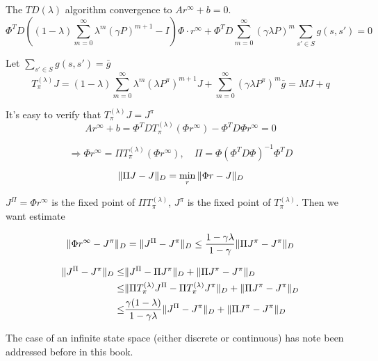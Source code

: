 The $ TD(\lambda) $ algorithm convergence to $ Ar^{\infty} + b = 0 $.
\[
    \Phi^T D \left( (1 - \lambda) \sum^{\infty}_{m = 0} \lambda^m{(\gamma P)}^{m+1} - I \right) \Phi \cdot r^{\infty}
    + \Phi^{T} D \sum^{\infty}_{m = 0} {(\gamma \lambda P)}^{m} \sum^{}_{s' \in S} g(s, s') = 0
\]
\begin{definition} Let $ \sum^{}_{s' \in S} g(s, s') = \bar g $
    \[
        T_{\pi}^{(\lambda)} J = (1 - \lambda) \sum^{\infty}_{m = 0} \lambda^m {(\lambda P^{\pi})}^{m+1} J + \sum^{\infty}_{m=0} {(\gamma\lambda P^{\pi})}^{m} \bar g = MJ + q
    \]
\end{definition}
It's easy to verify that $ T^{(\lambda)}_{\pi} J = J^{\pi} $
\[
    A r^{\infty} + b = \Phi^T D T^{(\lambda)}_{\pi} (\Phi r^{\infty}) - \Phi^T D \Phi r^{\infty} = 0
\]

\[
    \Rightarrow \Phi r^{\infty} = \Pi  T^{(\lambda)}_{\pi}(\Phi r^{\infty}), \quad
    \Pi = \Phi {(\Phi^T D \Phi)}^{-1} \Phi^T D
\]

\begin{lemma}
    \[
        \Arrowvert \Pi J - J \Arrowvert_{D} = \min_{r} \Arrowvert \Phi r - J \Arrowvert_{D}
    \]
\end{lemma}

$ J^{\Pi} = \Phi r^{\infty} $ is the fixed point of $ \Pi T^{(\lambda)}_{\pi} $, $ J^{\pi} $ is the fixed point of $ T^{(\lambda)}_{\pi} $. Then we want estimate

\begin{lemma}
    \[
        \Arrowvert \Phi r^{\infty} - J^{\pi} \Arrowvert_{D} = \Arrowvert J^{\Pi} - J^{\pi} \Arrowvert_D \le \frac{1 - \gamma\lambda}{1 - \gamma} \Arrowvert \Pi J^{\pi} - J^{\pi} \Arrowvert_D 
    \]
\end{lemma}
\begin{align*}
    \Arrowvert J^{\Pi} - J^{\pi} \Arrowvert_D \le& \Arrowvert J^{\Pi} - \Pi J^{\pi} \Arrowvert_D + \Arrowvert \Pi J^{\pi} - J^{\pi} \Arrowvert_D\\
    \le& \Arrowvert \Pi T^{(\lambda)}_{\pi} J^{\Pi} - \Pi T^{(\lambda)}_{\pi} J^{\pi} \Arrowvert_{D} +\Arrowvert \Pi J^{\pi} - J^{\pi} \Arrowvert_D\\
    \le& \frac{\gamma(1 - \lambda)}{1 - \gamma\lambda} \Arrowvert J^{\Pi} - J^{\pi} \Arrowvert_D + \Arrowvert \Pi J^{\pi} - J^{\pi} \Arrowvert_D\\
\end{align*}

The case of an infinite state space (either discrete or continuous) has note been addressed before in this book.

